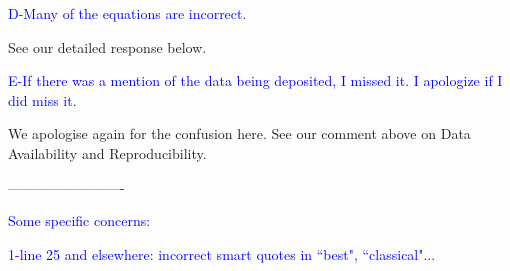 \documentclass[11pt]{letter}
\begin{document}
\begin{letter}{}







\textcolor{blue}{D-Many of the equations are incorrect.}

See our detailed response below.


\textcolor{blue}{E-If there was a mention of the data being deposited, I missed it. I apologize if I did miss it.}

We apologise again for the confusion here. See our comment above on Data Availability and Reproducibility.


\textcolor{blue}{-------------------------}

\textcolor{blue}{Some specific concerns:}

\textcolor{blue}{1-line 25 and elsewhere: incorrect smart quotes in ``best", ``classical"...}


\end{letter}
\end{document}

